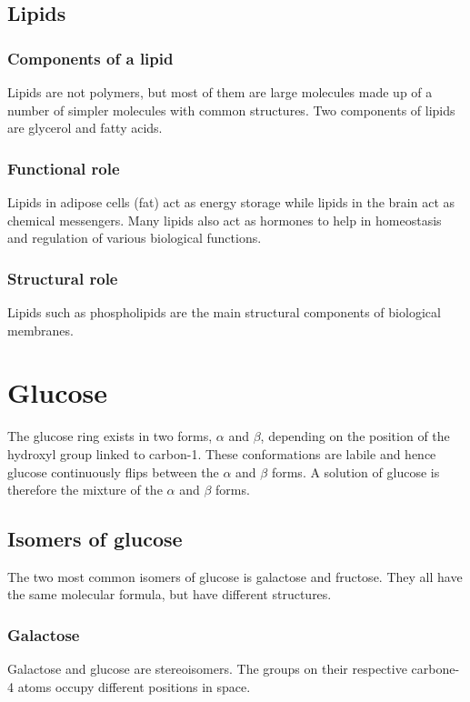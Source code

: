 \documentclass[11pt]{article}
\begin{document}
\subsection{Lipids}
\label{sec:org445e4a3}

\subsubsection{Components of a lipid}
\label{sec:org2b7fd28}
Lipids are not polymers, but most of them are large molecules made up of a number of simpler molecules with common structures. Two components of lipids are glycerol and fatty acids.

\subsubsection{Functional role}
\label{sec:org2e9401b}
Lipids in adipose cells (fat) act as energy storage while lipids in the brain act as chemical messengers. Many lipids also act as hormones to help in homeostasis and regulation of various biological functions.

\subsubsection{Structural role}
\label{sec:org73d7e97}
Lipids such as phospholipids are the main structural components of biological membranes.

\section{Glucose}
\label{sec:org7b72868}
The glucose ring exists in two forms, \(\alpha\) and \(\beta\), depending on the position of the hydroxyl group linked to carbon-1. These conformations are labile and hence glucose continuously flips between the \(\alpha\) and \(\beta\) forms. A solution of glucose is therefore the mixture of the \(\alpha\) and \(\beta\) forms.

\subsection{Isomers of glucose}
\label{sec:org4a59661}
The two most common isomers of glucose is galactose and fructose. They all have the same molecular formula, but have different structures.

\subsubsection{Galactose}
\label{sec:orgc544a9a}
Galactose and glucose are stereoisomers. The groups on their respective carbone-4 atoms occupy different positions in space.
\end{document}
